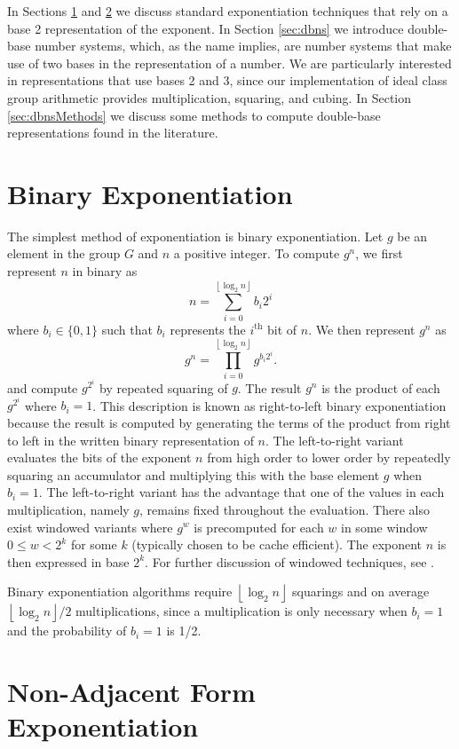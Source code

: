 \documentclass{ucalgthes1}
\theoremstyle{definition}
\newcommand{\floor}[1]{\left\lfloor #1 \right\rfloor}
\begin{document}
In Sections \ref{sec:binaryExp} and \ref{sec:naf} we discuss standard exponentiation techniques that rely on a base 2 representation of the exponent.  In Section \ref{sec:dbns} we introduce double-base number systems, which, as the name implies, are number systems that make use of two bases in the representation of a number.  We are particularly interested in representations that use bases 2 and 3, since our implementation of ideal class group arithmetic provides multiplication, squaring, and cubing. In Section \ref{sec:dbnsMethods} we discuss some methods to compute double-base representations found in the literature.  

\bigbreak
\section{Binary Exponentiation}
\label{sec:binaryExp}
The simplest method of exponentiation is binary exponentiation.  Let $g$ be an element in the group $G$ and $n$ a positive integer.  To compute $g^n$, we first represent $n$ in binary as
\[
	n = \sum_{i=0}^{\floor{\log_2 n}} b_i 2^i
\]
where $b_i \in \{0, 1\}$ such that $b_i$ represents the $i^{\textrm{th}}$ bit of $n$.  We then represent $g^n$ as
\[
	g^n = \prod_{i=0}^{\floor{\log_2 n}} g^{b_i 2^i}.
\]
and compute $g^{2^i}$ by repeated squaring of $g$.  The result $g^n$ is the product of each $g^{2^i}$ where $b_i = 1$.  This description is known as right-to-left binary exponentiation because the result is computed by generating the terms of the product from right to left in the written binary representation of $n$.  The left-to-right variant evaluates the bits of the exponent $n$ from high order to lower order by repeatedly squaring an accumulator and multiplying this with the base element $g$ when $b_i = 1$.  The left-to-right variant has the advantage that one of the values in each multiplication, namely $g$, remains fixed throughout the evaluation.  There also exist windowed variants where $g^w$ is precomputed for each $w$ in some window $0 \le w < 2^k$ for some $k$ (typically chosen to be cache efficient). The exponent $n$ is then expressed in base $2^k$.  For further discussion of windowed techniques, see \cite{Cohen2006}.

Binary exponentiation algorithms require $\floor{\log_2 n}$ squarings and on average $\floor{\log_2 n}/2$ multiplications, since a multiplication is only necessary when $b_i = 1$ and the probability of $b_i = 1$ is 1/2.


\bigbreak
\section{Non-Adjacent Form Exponentiation}
\label{sec:naf}
\end{document}
